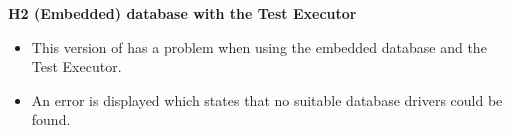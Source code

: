 
\textbf{H2 (Embedded) database with the Test Executor}\\
\begin{itemize}
\item This version of \app{} has a problem when using the embedded database and the Test Executor. 
\item An error is displayed which states that no suitable database drivers could be found. 
\end{itemize}
